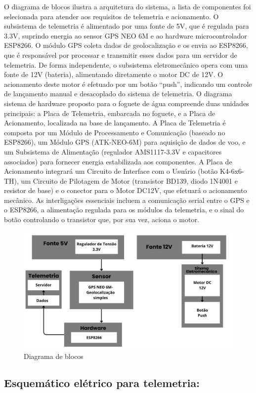 O diagrama de blocos ilustra a arquitetura do sistema, a lista de componentes foi selecionada para atender aos requisitos de telemetria e acionamento. O subsistema de telemetria é alimentado por uma fonte de 5V, que é regulada para 3.3V, suprindo energia ao sensor GPS NEO 6M 
e ao hardware microcontrolador ESP8266. O módulo GPS coleta dados de geolocalização e os envia ao ESP8266, que é responsável por processar e transmitir esses dados para um servidor de telemetria. De forma  independente, o subsistema eletromecânico opera com uma fonte de 12V  (bateria), alimentando diretamente o motor DC de 12V. O acionamento deste motor é efetuado por um botão “push”, indicando um controle de lançamento
manual e desacoplado do sistema de telemetria. O diagrama sistema de hardware proposto para o foguete de água compreende duas unidades principais: a Placa de Telemetria, embarcada no foguete, e a Placa de 
Acionamento, localizada na base de lançamento. A Placa de Telemetria é composta por um Módulo de Processamento e Comunicação (baseado no ESP8266), 
um Módulo GPS (ATK-NEO-6M) para aquisição de dados de voo, e um Subsistema de Alimentação (regulador AMS1117-3.3V e capacitores associados) para fornecer energia estabilizada aos componentes. A Placa de Acionamento integrará um Circuito de Interface com o Usuário (botão K4-6x6-TH), um Circuito de Pilotagem de Motor (transistor BD139, diodo 1N4001 e resistor de base) e o conector para o Motor DC12V, que efetuará o acionamento mecânico. As interligações essenciais incluem a comunicação serial entre o GPS e o ESP8266, a alimentação regulada para os módulos da telemetria, e o sinal do botão controlando o transistor que, por sua vez, aciona o motor.
 
 \begin{figure}[H]
    \centering
    \includegraphics[width=0.6\linewidth]{figuras/ESP8266.png}
    \caption{Diagrama de blocos}
    \label{fig:diagrama de blocos}
\end{figure}

 \subsection{Esquemático elétrico para telemetria:}

